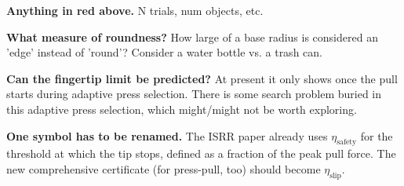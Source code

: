 \documentclass[10pt, conference]{IEEEtran}
\newcommand{\jx}[1]{\textcolor{blue}{JX: #1}}
\newcommand{\sh}[1]{\textcolor{orange!90!black}{\textbf{SH:} #1}}
\begin{document}

\medskip \noindent \textbf{Anything in red above.} N trials, num objects, etc.

\medskip\noindent\textbf{What measure of roundness?} How large of a base radius is considered an 'edge' instead of 'round'? Consider a water bottle vs. a trash can. 

\medskip\noindent\textbf{Can the fingertip limit be predicted?} At present it only shows once the pull starts during adaptive press selection. There is some search problem buried in this adaptive press selection, which might/might not be worth exploring.

\medskip\noindent\textbf{One symbol has to be renamed.} The ISRR paper already uses $\eta_{\mathrm{safety}}$ for the threshold at which the tip stops, defined as a fraction of the peak pull force. The new comprehensive certificate (for press-pull, too) should become $\eta_{\mathrm{slip}}$.


\end{document}
